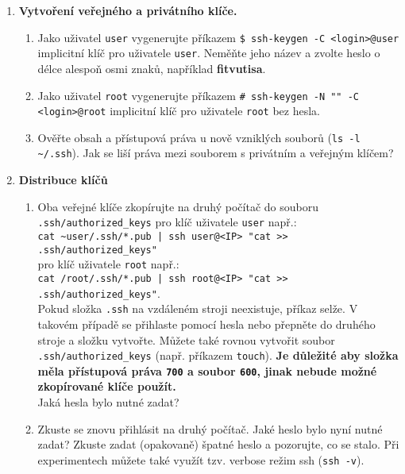 \documentclass[a4paper,11pt]{article}
\begin{document}
\begin{enumerate}
  \item {\bf Vytvoření veřejného a privátního klíče.}

    \begin{enumerate}

      \item Jako uživatel {\tt user} vygenerujte příkazem \verb|$ ssh-keygen -C <login>@user| implicitní klíč pro uživatele {\tt user}.
        Neměňte jeho název a zvolte heslo o délce alespoň osmi znaků, například \textbf{fitvutisa}.

      \item Jako uživatel {\tt root} vygenerujte příkazem \verb|# ssh-keygen -N "" -C <login>@root| implicitní klíč pro uživatele {\tt root} bez hesla.

      \item Ověřte obsah a přístupová práva u nově vzniklých souborů (\verb|ls -l ~/.ssh|).
        Jak se liší práva mezi souborem s privátním a veřejným klíčem?

    \end{enumerate}

  \item {\bf Distribuce klíčů}

    \begin{enumerate}

      \item Oba veřejné klíče zkopírujte na druhý počítač do souboru \verb|.ssh/authorized_keys| pro klíč uživatele {\tt user} např.: \\
        {\verb&cat ~user/.ssh/*.pub | ssh user@<IP> "cat >> .ssh/authorized_keys"&} \\
        pro klíč uživatele {\tt root} např.: \\
        {\verb&cat /root/.ssh/*.pub | ssh root@<IP> "cat >> .ssh/authorized_keys"&}. \\

        Pokud složka {\tt .ssh} na vzdáleném stroji neexistuje, příkaz selže.
        V takovém případě se přihlaste pomocí hesla nebo přepněte do druhého stroje a složku vytvořte.
        Můžete také rovnou vytvořit soubor {\tt .ssh/authorized\_keys} (např. příkazem {\tt touch}).
        {\bf Je důležité aby složka měla přístupová práva {\tt 700} a soubor {\tt 600}, jinak nebude možné zkopírované klíče použít.}\\

      Jaká hesla bylo nutné zadat?

      \item Zkuste se znovu přihlásit na druhý počítač.
        Jaké heslo bylo nyní nutné zadat?
        Zkuste zadat (opakovaně) špatné heslo a pozorujte, co se stalo.
        Při experimentech můžete také využít tzv. verbose režim ssh ({\tt ssh -v}).


\end{enumerate}
\end{enumerate}
\end{document}
